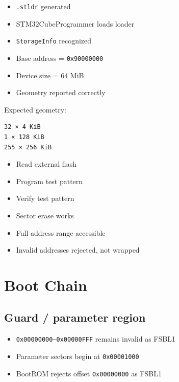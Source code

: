 \documentclass[10pt,a4paper,oneside]{report}
\providecommand{\tightlist}{\setlength{\itemsep}{1pt}\setlength{\parskip}{1pt}}
\begin{document}
\begin{itemize}
\tightlist
\item[$\square$]
  \texttt{.\allowbreak{}stldr} generated
\item[$\square$]
  STM32CubeProgrammer loads loader
\item[$\square$]
  \texttt{StorageInfo} recognized
\item[$\square$]
  Base address = \texttt{0x90000000}
\item[$\square$]
  Device size = 64 MiB
\item[$\square$]
  Geometry reported correctly
\end{itemize}

Expected geometry:

\begin{verbatim}
32 × 4 KiB
1 × 128 KiB
255 × 256 KiB
\end{verbatim}

\begin{itemize}
\tightlist
\item[$\square$]
  Read external flash
\item[$\square$]
  Program test pattern
\item[$\square$]
  Verify test pattern
\item[$\square$]
  Sector erase works
\item[$\square$]
  Full address range accessible
\item[$\square$]
  Invalid addresses rejected, not wrapped
\end{itemize}

\section{Boot Chain}\label{wiki-hardware-bring-up-and-testing--9-boot-chain}

\subsection{Guard / parameter region}\label{wiki-hardware-bring-up-and-testing--91-guard--parameter-region}

\begin{itemize}
\tightlist
\item[$\square$]
  \texttt{0x00000000–0x00000FFF} remains invalid as FSBL1
\item[$\square$]
  Parameter sectors begin at \texttt{0x00001000}
\item[$\square$]
  BootROM rejects offset \texttt{0x00000000} as FSBL1
\end{itemize}
\end{document}
